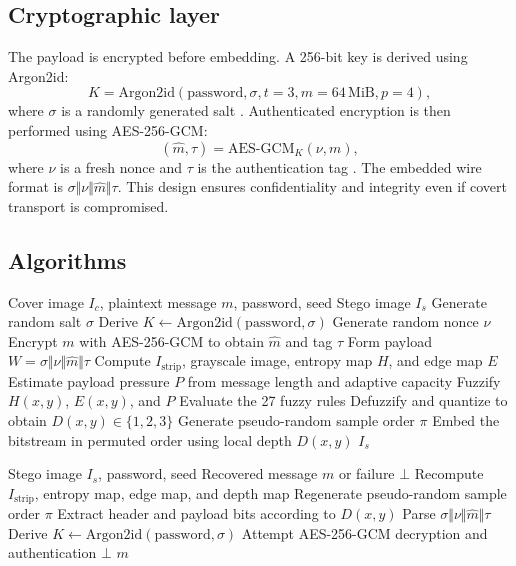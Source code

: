\subsection{Cryptographic layer}
The payload is encrypted before embedding. A 256-bit key is derived using Argon2id:
\begin{equation}
K=\mathrm{Argon2id}(\text{password},\sigma,t=3,m=64\,\text{MiB},p=4),
\end{equation}
where \(\sigma\) is a randomly generated salt \cite{rfc9106}. Authenticated encryption is then performed using AES-256-GCM:
\begin{equation}
(\hat{m},\tau)=\mathrm{AES\mbox{-}GCM}_{K}(\nu,m),
\end{equation}
where \(\nu\) is a fresh nonce and \(\tau\) is the authentication tag \cite{nistgcm}. The embedded wire format is \(\sigma \Vert \nu \Vert \hat{m} \Vert \tau\). This design ensures confidentiality and integrity even if covert transport is compromised.

\subsection{Algorithms}
\begin{algorithm}[H]
\caption{Adaptive fuzzy embedding}
\begin{algorithmic}[1]
\Require Cover image \(I_c\), plaintext message \(m\), password, seed
\Ensure Stego image \(I_s\)
\State Generate random salt \(\sigma\)
\State Derive \(K \gets \mathrm{Argon2id}(\text{password},\sigma)\)
\State Generate random nonce \(\nu\)
\State Encrypt \(m\) with AES-256-GCM to obtain \(\hat{m}\) and tag \(\tau\)
\State Form payload \(W=\sigma \Vert \nu \Vert \hat{m} \Vert \tau\)
\State Compute \(I_{\text{strip}}\), grayscale image, entropy map \(H\), and edge map \(E\)
\State Estimate payload pressure \(P\) from message length and adaptive capacity
    \State Fuzzify \(H(x,y)\), \(E(x,y)\), and \(P\)
    \State Evaluate the 27 fuzzy rules
    \State Defuzzify and quantize to obtain \(D(x,y)\in\{1,2,3\}\)
\EndFor
\State Generate pseudo-random sample order \(\pi\)
\State Embed the bitstream in permuted order using local depth \(D(x,y)\)
\State \Return \(I_s\)
\end{algorithmic}
\end{algorithm}

\begin{algorithm}[H]
\caption{Adaptive extraction}
\begin{algorithmic}[1]
\Require Stego image \(I_s\), password, seed
\Ensure Recovered message \(m\) or failure \(\bot\)
\State Recompute \(I_{\text{strip}}\), entropy map, edge map, and depth map
\State Regenerate pseudo-random sample order \(\pi\)
\State Extract header and payload bits according to \(D(x,y)\)
\State Parse \(\sigma \Vert \nu \Vert \hat{m} \Vert \tau\)
\State Derive \(K \gets \mathrm{Argon2id}(\text{password},\sigma)\)
\State Attempt AES-256-GCM decryption and authentication
    \State \Return \(\bot\)
\Else
    \State \Return \(m\)
\EndIf
\end{algorithmic}
\end{algorithm}

